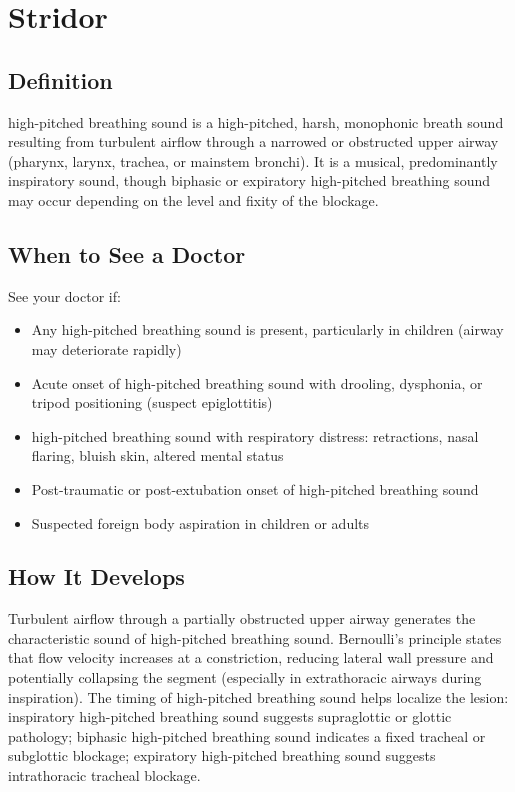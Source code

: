 \chapter{Stridor}

\section*{Definition}
high-pitched breathing sound is a high-pitched, harsh, monophonic breath sound resulting from turbulent airflow through a narrowed or obstructed upper airway (pharynx, larynx, trachea, or mainstem bronchi). It is a musical, predominantly inspiratory sound, though biphasic or expiratory high-pitched breathing sound may occur depending on the level and fixity of the blockage.

\section*{When to See a Doctor}
See your doctor if:
\begin{itemize}
  \item Any high-pitched breathing sound is present, particularly in children (airway may deteriorate rapidly)
  \item Acute onset of high-pitched breathing sound with drooling, dysphonia, or tripod positioning (suspect epiglottitis)
  \item high-pitched breathing sound with respiratory distress: retractions, nasal flaring, bluish skin, altered mental status
  \item Post-traumatic or post-extubation onset of high-pitched breathing sound
  \item Suspected foreign body aspiration in children or adults
\end{itemize}

\section*{How It Develops}
Turbulent airflow through a partially obstructed upper airway generates the characteristic sound of high-pitched breathing sound. Bernoulli's principle states that flow velocity increases at a constriction, reducing lateral wall pressure and potentially collapsing the segment (especially in extrathoracic airways during inspiration). The timing of high-pitched breathing sound helps localize the lesion: inspiratory high-pitched breathing sound suggests supraglottic or glottic pathology; biphasic high-pitched breathing sound indicates a fixed tracheal or subglottic blockage; expiratory high-pitched breathing sound suggests intrathoracic tracheal blockage.


